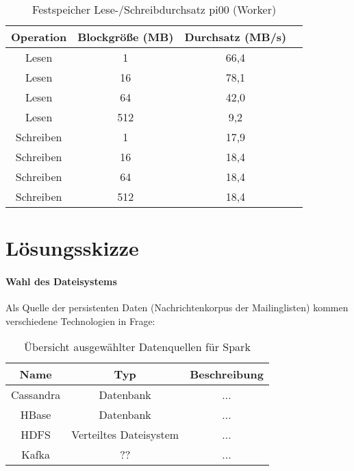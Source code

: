 \begin{table}[ht]
	\centering %
	\begin{tabular}{c c c c} %
	\hline\hline %
	Operation & Blockgröße (MB) & Durchsatz (MB/s) \\ [0.5ex] %
	\hline %
	Lesen & 1 & 66,4 \\ 
	Lesen & 16 & 78,1 \\
	Lesen & 64 & 42,0 \\
	Lesen & 512 & 9,2 \\
	Schreiben & 1 & 17,9 \\ 
	Schreiben & 16 & 18,4 \\
	Schreiben & 64 & 18,4 \\
	Schreiben & 512 & 18,4 \\[1ex] 
	\hline %
	\end{tabular}
	\caption{Festspeicher Lese-/Schreibdurchsatz pi00 (Worker)} %
	\label{table:worker_harddrive} %
\end{table}



\section{Lösungsskizze}
\paragraph{Wahl des Dateisystems}

Als Quelle der persistenten Daten (Nachrichtenkorpus der Mailinglisten) kommen verschiedene Technologien in Frage:

\begin{table}[ht]
	\caption{Übersicht ausgewählter Datenquellen für Spark} %
	\centering %
	\begin{tabular}{c c c} %
	\hline\hline %
	Name & Typ & Beschreibung\\ [0.5ex] %
	\hline %
	Cassandra & Datenbank & ...\\ %
	HBase & Datenbank & ...\\
	HDFS & Verteiltes Dateisystem & ...\\
	Kafka & ?? & ...\\
	\hline %
	\end{tabular}
	\label{table:dsources} %
\end{table}

